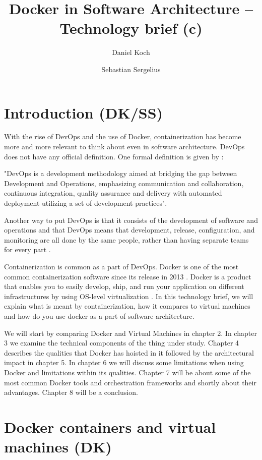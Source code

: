 \documentclass[fleqn,12pt]{olplainarticle}
\title{Docker in Software Architecture – Technology brief (c)}
\author[1]{Daniel Koch}
\author[2]{Sebastian Sergelius}
\affil[1]{daniel.koch@helsinki.fi}
\affil[2]{sebastian.sergelius@helsinki.fi}
\begin{document}
\flushbottom
\maketitle
\thispagestyle{empty}
\pagebreak
\tableofcontents
\section{Introduction (DK/SS)}

With the rise of DevOps and the use of Docker, containerization has become more and more relevant to think about even in software architecture. DevOps does not have any official definition.
One formal definition is given by \cite{Jabbari_devops}: 
\begin{displayquote}
"DevOps is a development methodology aimed at bridging the gap between Development and Operations, emphasizing communication and collaboration, continuous integration, quality assurance and delivery with automated deployment utilizing a set of development practices".
\end{displayquote}
Another way to put DevOps is that it consists of the development of software and operations and that DevOps means that development, release, configuration, and monitoring are all done by the same people, rather than having separate teams for every part \citep{hy:DevOps_with_Docker}.

Containerization is common as a part of DevOps. Docker is one of the most common containerization software since its release in 2013 \citep{aquasec:orchestration}. Docker is a product that enables you to easily develop, ship, and run your application on different infrastructures by using OS-level virtualization \citep{docker:overview}. In this technology brief, we will explain what is meant by containerization, how it compares to virtual machines and how do you use docker as a part of software architecture. 

We will start by comparing Docker and Virtual Machines in chapter 2. In chapter 3 we examine the technical components of the thing under study. Chapter 4 describes the qualities that Docker has hoisted in it followed by the architectural impact in chapter 5. In chapter 6 we will discuss some limitations when using Docker and limitations within its qualities. Chapter 7 will be about some of the most common Docker tools and orchestration frameworks and shortly about their advantages. Chapter 8 will be a conclusion.

\section{Docker containers and virtual machines (DK)}
\end{document}
